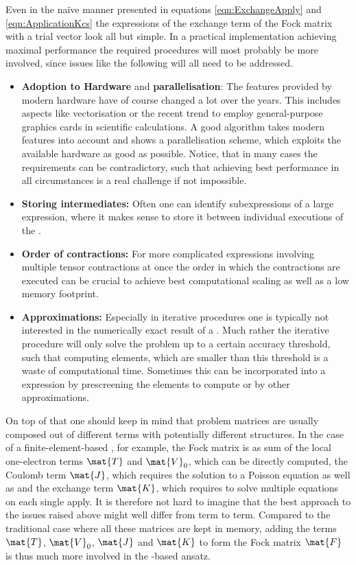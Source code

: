 Even in the na\"{i}ve manner presented
in equations \eqref{eqn:ExchangeApply} and \eqref{eqn:ApplicationKcs}
the \contraction expressions
of the exchange term of the Fock matrix with a trial vector
look all but simple.
In a practical implementation achieving maximal performance
the required procedures will most probably be more involved,
since issues like the following will all need to be addressed.
\begin{itemize}
	\item \textbf{Adoption to Hardware} and \textbf{parallelisation}:
		The features provided by modern hardware
		have of course changed a lot over the years.
		This includes aspects like vectorisation
		or the recent trend to employ general-purpose graphics cards
		in scientific calculations.
		A good algorithm takes modern features into account
		and shows a parallelisation scheme,
		which exploits the available hardware as good as possible.
		Notice, that in many cases the requirements
		can be contradictory,
		such that achieving best performance in all circumstances
		is a real challenge if not impossible.
	\item \textbf{Storing intermediates:}
		Often one can identify subexpressions
		of a large \contraction expression,
		where it makes sense to store it between individual
		executions of the \contraction.
	\item \textbf{Order of contractions:}
		For more complicated expressions involving
		multiple tensor contractions at once the order
		in which the contractions are executed can be crucial
		to achieve best computational scaling
		as well as a low memory footprint.
	\item \textbf{Approximations:}
		Especially in iterative procedures one is typically not
		interested in the numerically exact result
		of a \contraction.
		Much rather the iterative procedure will only solve
		the problem up to a certain accuracy threshold,
		such that computing elements,
		which are smaller than this threshold is a waste of computational time.
		Sometimes this can be incorporated into a \contraction expression
		by prescreening the elements to compute or by other approximations.
\end{itemize}
On top of that one should keep in mind that problem matrices
are usually composed out of different terms
with potentially different structures.
In the case of  a finite-element-based \SCF, for example, the Fock matrix
is as sum of the local one-electron terms $\mat{T}$ and $\mat{V}_0$,
which can be directly computed,
the Coulomb term $\mat{J}$,
which requires the solution to a Poisson equation
as well as
and the exchange term $\mat{K}$, which requires to solve
multiple equations on each single apply.
It is therefore not hard to imagine
that the best approach to the issues raised above might
well differ from term to term.
Compared to the traditional case where all these matrices
are kept in memory,
adding the terms $\mat{T}$, $\mat{V}_0$, $\mat{J}$
and $\mat{K}$ to form the Fock matrix $\mat{F}$
is thus much more involved in the \contraction-based ansatz.

